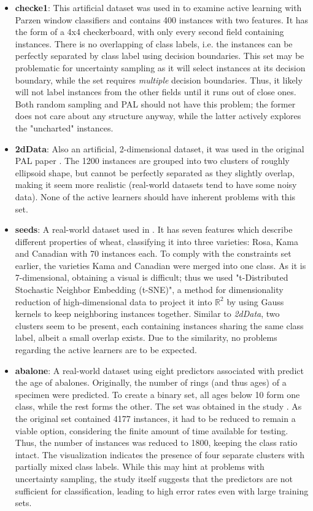 \begin{itemize}
	\item \textbf{checke1}: This artificial dataset was used in \cite{Chapelle2005} to examine active learning with Parzen window classifiers and contains 400 instances with two features. It has the form of a 4x4 checkerboard, with only every second field containing instances. There is no overlapping of class labels, i.e. the instances can be perfectly separated by class label using decision boundaries. This set may be problematic for uncertainty sampling as it will select instances at its decision boundary, while the set requires \textit{multiple} decision boundaries. Thus, it likely will not label instances from the other fields until it runs out of close ones. Both random sampling and PAL should not have this problem; the former does not care about any structure anyway, while the latter actively explores the "uncharted" instances.
	\item \textbf{2dData}: Also an artificial, 2-dimensional dataset, it was used in the original PAL paper \cite{KremplEtAl2014}. The 1200 instances are grouped into two clusters of roughly ellipsoid shape, but cannot be perfectly separated as they slightly overlap, making it seem more realistic (real-world datasets tend to have some noisy data). None of the active learners should have inherent problems with this set.
	\item \textbf{seeds}: A real-world dataset used in \cite{CharytanowiczEtAl2010}. It has seven features which describe different properties of wheat, classifying it into three varieties: Rosa, Kama and Canadian with 70 instances each. To comply with the constraints set earlier, the varieties Kama and Canadian were merged into one class. As it is 7-dimensional, obtaining a visual is difficult; thus we used "t-Distributed Stochastic Neighbor Embedding (t-SNE)", a method for dimensionality reduction of high-dimensional data \cite{vanDerMaaten2008} to project it into $\mathbb{R}^2$ by using Gauss kernels to keep neighboring instances together. Similar to \textit{2dData}, two clusters seem to be present, each containing instances sharing the same class label, albeit a small overlap exists. Due to the similarity, no problems regarding the active learners are to be expected.
	\item \textbf{abalone}: A real-world dataset using eight predictors associated with predict the age of abalones. Originally, the number of rings (and thus ages) of a specimen were predicted. To create a binary set, all ages below 10 form one class, while the rest forms the other. The set was obtained in the study \cite{NashEtAl1994}. As the original set contained 4177 instances, it had to be reduced to remain a viable option, considering the finite amount of time available for testing. Thus, the number of instances was reduced to 1800, keeping the class ratio intact. The visualization indicates the presence of four separate clusters with partially mixed class labels. While this may hint at problems with uncertainty sampling, the study itself suggests that the predictors are not sufficient for classification, leading to high error rates even with large training sets.
\end{itemize}

